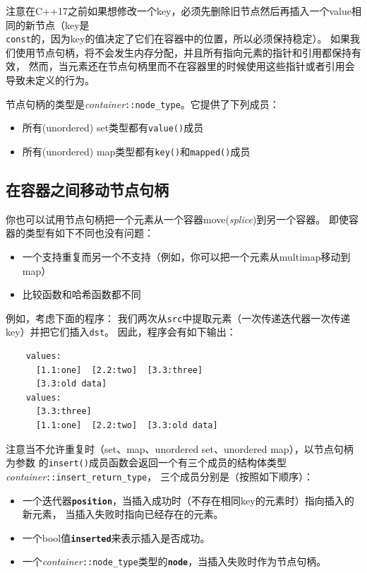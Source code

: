 注意在C++17之前如果想修改一个key，必须先删除旧节点然后再插入一个value相同的新节点（key是\\
\texttt{const}的，因为key的值决定了它们在容器中的位置，所以必须保持稳定）。
如果我们使用节点句柄，将不会发生内存分配，并且所有指向元素的指针和引用都保持有效，
然而，当元素还在节点句柄里而不在容器里的时候使用这些指针或者引用会导致未定义的行为。

节点句柄的类型是\emph{container}\texttt{::node\_type}。它提供了下列成员：
\begin{itemize}
    \item 所有(unordered) set类型都有\texttt{value()}成员
    \item 所有(unordered) map类型都有\texttt{key()}和\texttt{mapped()}成员
\end{itemize}

\subsection{在容器之间移动节点句柄}
你也可以试用节点句柄把一个元素从一个容器move(\emph{splice})到另一个容器。
即使容器的类型有如下不同也没有问题：
\begin{itemize}
    \item 一个支持重复而另一个不支持（例如，你可以把一个元素从multimap移动到map）
    \item 比较函数和哈希函数都不同
\end{itemize}
例如，考虑下面的程序：
我们两次从\texttt{src}中提取元素（一次传递迭代器一次传递key）并把它们插入\texttt{dst}。
因此，程序会有如下输出：
\begin{lstlisting}
    values:
      [1.1:one]  [2.2:two]  [3.3:three]
      [3.3:old data]
    values:
      [3.3:three]
      [1.1:one]  [2.2:two]  [3.3:old data]
\end{lstlisting}
注意当不允许重复时（set、map、unordered set、unordered map），以节点句柄为参数
的\texttt{insert()}成员函数会返回一个有三个成员的结构体类型\emph{container}\texttt{::insert\_return\_type}，
三个成员分别是（按照如下顺序）：\label{insert节点句柄}
\begin{itemize}
    \item 一个迭代器\textbf{\texttt{position}}，当插入成功时（不存在相同key的元素时）指向插入的新元素，
    当插入失败时指向已经存在的元素。
    \item 一个bool值\textbf{\texttt{inserted}}来表示插入是否成功。
    \item 一个\emph{container}\texttt{::node\_type}类型的\textbf{\texttt{node}}，当插入失败时作为节点句柄。
\end{itemize}
